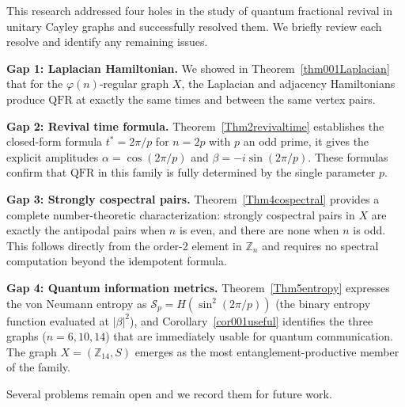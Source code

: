 \documentclass[12pt]{amsart}
\newcommand{\QFR}{\mathrm{QFR}}
\begin{document}
This research addressed four holes in the study of quantum fractional revival in unitary Cayley graphs and successfully resolved them. We briefly review each resolve and identify any remaining issues.

\medskip

\noindent\textbf{Gap 1: Laplacian Hamiltonian.} We showed in Theorem~\ref{thm001Laplacian} that
for the $\varphi(n)$-regular graph $X$, the Laplacian and adjacency
Hamiltonians produce $\QFR$ at exactly the same times and between the same vertex pairs.


\medskip

\noindent\textbf{Gap 2: Revival time formula.} Theorem~\ref{Thm2revivaltime} establishes
the closed-form formula $t^*=2\pi/p$ for $n=2p$ with $p$ an odd prime, it gives the explicit amplitudes $\alpha = \cos(2\pi/p)$ and
$\beta = -i\sin(2\pi/p)$. These formulas confirm that $\QFR$ in this family is fully
determined by the single parameter $p$.

\medskip

\noindent\textbf{Gap 3: Strongly cospectral pairs.} Theorem~\ref{Thm4cospectral} provides
a complete number-theoretic characterization: strongly cospectral pairs in
$X$ are exactly the antipodal pairs when $n$ is even, and there are
none when $n$ is odd. This follows directly from the order-2 element in $\mathbb{Z}_n$
and requires no spectral computation beyond the idempotent formula.

\medskip

\noindent\textbf{Gap 4: Quantum information metrics.} Theorem~\ref{Thm5entropy} expresses
the von Neumann entropy as $\mathcal{S}_p=H(\sin^2(2\pi/p))$ (the binary entropy
function evaluated at $|\beta|^2$), and Corollary~\ref{cor001useful} identifies the three
graphs ($n= 6, 10, 14$) that are immediately usable for quantum communication. The graph
$X = (\mathbb{Z}_{14}, S)$ emerges as the most entanglement-productive member of the
family.

\medskip

\noindent Several problems remain open and we record them for future work.
\end{document}
